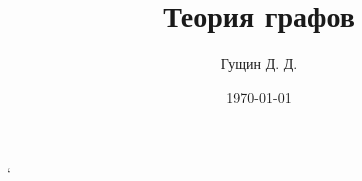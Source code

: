 \documentclass[12pt, twoside]{book}
\author{Гущин Д. Д.}
\title{Теория графов}
\date{\today}
\begin{document}
    \maketitle
    \tableofcontents
`	
	
	
	
	
	
	
	
	
	
	
	
%	
%	
\end{document}
